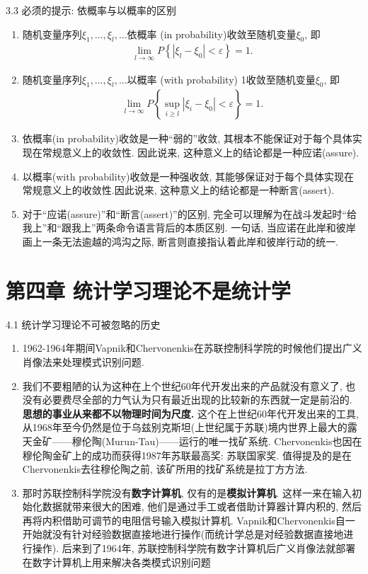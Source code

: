 \documentclass[compress,10pt,dvipsnames,notheorems]{beamer} %
\begin{document}
\begin{frame}{3.3 必须的提示: 依概率与以概率的区别}
\begin{enumerate}
\item 随机变量序列$\xi_{1},\ldots, \xi_{l}, \ldots$依概率 (in probability)收敛至随机变量$\xi_{0}$, 即
\begin{align*}
\lim _{l \rightarrow \infty} P\left\{\left|\xi_{l}-\xi_{0}\right|<\varepsilon\right\}=1.
\end{align*}
\item 随机变量序列$\xi_{1},\ldots, \xi_{l}, \ldots$以概率 (with probability) 1收敛至随机变量$\xi_{0}$, 即
\begin{align*}
\lim _{l \rightarrow \infty} P\left\{\sup _{i \geq l}\left|\xi_{i}-\xi_{0}\right|<\varepsilon\right\}=1.
\end{align*}
\item 依概率(in probability)收敛是一种“弱的”收敛, 其根本不能保证对于每个具体实现在常规意义上的收敛性. 因此说来, 这种意义上的结论都是一种应诺(assure). 
\item 以概率(with probability)收敛是一种强收敛, 其能够保证对于每个具体实现在常规意义上的收敛性.因此说来, 这种意义上的结论都是一种断言(assert). 
\item 对于“应诺(assure)”和“断言(assert)”的区别, 完全可以理解为在战斗发起时“\textsf{给}我上”和“\textsf{跟}我上”两条命令语言背后的本质区别. 一句话, 当应诺在此岸和彼岸画上一条无法逾越的鸿沟之际, 断言则直接指认着此岸和彼岸行动的统一.
\end{enumerate}
\end{frame}



\section{第四章 统计学习理论不是统计学}
\begin{frame}{4.1 统计学习理论不可被忽略的历史}
\begin{enumerate}
\item 1962-1964年期间Vapnik和Chervonenkis在苏联控制科学院的时候他们提出广义肖像法来处理模式识别问题.
\item 我们不要粗陋的认为这种在上个世纪60年代开发出来的产品就没有意义了, 也没有必要费尽全部的力气认为只有最近出现的比较新的东西就一定是前沿的. \textbf{思想的事业从来都不以物理时间为尺度.} 这个在上世纪60年代开发出来的工具, 从1968年至今仍然是位于乌兹别克斯坦(上世纪属于苏联)境内世界上最大的露天金矿——穆伦陶(Murun-Tau)——运行的唯一找矿系统. Chervonenkis也因在穆伦陶金矿上的成功而获得1987年苏联最高奖: 苏联国家奖. 值得提及的是在Chervonenkis去往穆伦陶之前, 该矿所用的找矿系统是拉丁方方法.
\item 那时苏联控制科学院没有\textbf{数字计算机}, 仅有的是\textbf{模拟计算机}. 这样一来在输入初始化数据就带来很大的困难, 他们是通过手工或者借助计算器计算内积的, 然后再将内积借助可调节的电阻信号输入模拟计算机. Vapnik和Chervonenkis自一开始就没有针对经验数据直接地进行操作(而统计学总是对经验数据直接地进行操作). 后来到了1964年, 苏联控制科学院有数字计算机后广义肖像法就部署在数字计算机上用来解决各类模式识别问题
\end{enumerate}
\end{frame}
\end{document}
